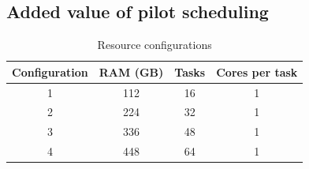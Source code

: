 	\subsection{Added value of pilot scheduling}
	    \begin{table}                                                                    
		\centering                                                                       
		\begin{tabular}{c|c|c|c}                                                             
		\rowcolor{headcolor}                                                             
		Configuration & RAM (GB) & Tasks & Cores per task\\
		
		\hline                                                                           
		1 & 112 & 16 & 1\\
		
		2 & 224 & 32 & 1\\
		
		3 & 336 & 48 & 1\\
		4 & 448 & 64 & 1\\
		\end{tabular}                                                                    
		\setlength{\belowcaptionskip}{-10pt}                                             
		\caption{Resource configurations}                                                    
		\label{table:spa:dedicatednodes}                                                            
	    \end{table} 
	       
